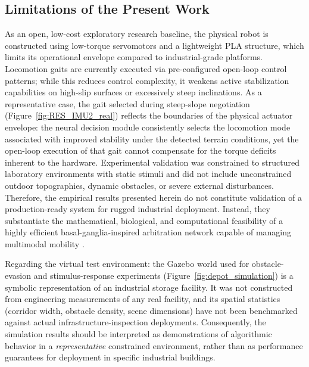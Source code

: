 \subsection{Limitations of the Present Work}
\label{ssec:Limitations}

As an open, low-cost exploratory research baseline, the physical robot is constructed using low-torque servomotors and a lightweight PLA structure, which limits its operational envelope compared to industrial-grade platforms. Locomotion gaits are currently executed via pre-configured open-loop control patterns; while this reduces control complexity, it weakens active stabilization capabilities on high-slip surfaces or excessively steep inclinations.  As a representative case, the gait selected during steep-slope negotiation (Figure~\ref{fig:RES_IMU2_real}) reflects the boundaries of the physical actuator envelope: the neural decision module consistently selects the locomotion mode associated with improved stability under the detected terrain conditions, yet the open-loop execution of that gait cannot compensate for the torque deficits inherent to the hardware. Experimental validation was constrained to structured laboratory environments with static stimuli and did not include unconstrained outdoor topographies, dynamic obstacles, or severe external disturbances. Therefore, the empirical results presented herein do not constitute validation of a production-ready system for rugged industrial deployment. Instead, they substantiate the mathematical, biological, and computational feasibility of a highly efficient basal-ganglia-inspired arbitration network capable of managing multimodal mobility .



%
Regarding the virtual test environment: the Gazebo world used for
obstacle-evasion and stimulus-response experiments
(Figure~\ref{fig:depot_simulation}) is a symbolic representation
of an industrial storage facility.
It was not constructed from engineering measurements of any
real facility, and its spatial statistics (corridor width,
obstacle density, scene dimensions) have not been benchmarked
against actual infrastructure-inspection deployments.
Consequently, the simulation results should be interpreted as
demonstrations of algorithmic behavior in a \emph{representative}
constrained environment, rather than as performance guarantees
for deployment in specific industrial buildings.%


